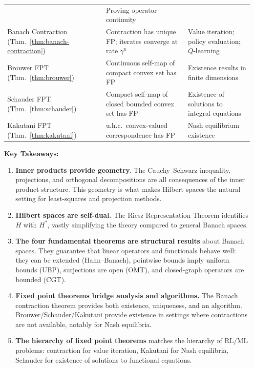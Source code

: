 \documentclass[11pt,a4paper]{article}
\theoremstyle{definition}
\theoremstyle{plain}
\theoremstyle{remark}
\begin{document}
\begin{center}
\begin{tabular}{p{4.0cm} p{5.5cm} p{4.5cm}}
    & Proving operator continuity \\
\addlinespace
Banach Contraction (Thm.~\ref{thm:banach-contraction})
    & Contraction has unique FP; iterates converge at rate $\gamma^n$
    & Value iteration; policy evaluation; $Q$-learning \\
\addlinespace
Brouwer FPT (Thm.~\ref{thm:brouwer})
    & Continuous self-map of compact convex set has FP
    & Existence results in finite dimensions \\
\addlinespace
Schauder FPT (Thm.~\ref{thm:schauder})
    & Compact self-map of closed bounded convex set has FP
    & Existence of solutions to integral equations \\
\addlinespace
Kakutani FPT (Thm.~\ref{thm:kakutani})
    & u.h.c.\ convex-valued correspondence has FP
    & Nash equilibrium existence \\
\bottomrule
\end{tabular}
\end{center}

\bigskip

\noindent\textbf{Key Takeaways:}
\begin{enumerate}[leftmargin=2em]
    \item \textbf{Inner products provide geometry.} The Cauchy--Schwarz
          inequality, projections, and orthogonal decompositions are all
          consequences of the inner product structure. This geometry is
          what makes Hilbert spaces the natural setting for least-squares
          and projection methods.
    \item \textbf{Hilbert spaces are self-dual.} The Riesz Representation
          Theorem identifies $H$ with $H^*$, vastly simplifying the theory
          compared to general Banach spaces.
    \item \textbf{The four fundamental theorems are structural results} about
          Banach spaces. They guarantee that linear operators and functionals
          behave well: they can be extended (Hahn--Banach), pointwise bounds
          imply uniform bounds (UBP), surjections are open (OMT), and
          closed-graph operators are bounded (CGT).
    \item \textbf{Fixed point theorems bridge analysis and algorithms.}
          The Banach contraction theorem provides both existence, uniqueness,
          and an algorithm. Brouwer/Schauder/Kakutani provide existence in
          settings where contractions are not available, notably for Nash
          equilibria.
    \item \textbf{The hierarchy of fixed point theorems} matches the hierarchy
          of RL/ML problems: contraction for value iteration, Kakutani for
          Nash equilibria, Schauder for existence of solutions to
          functional equations.
\end{enumerate}
\end{document}
